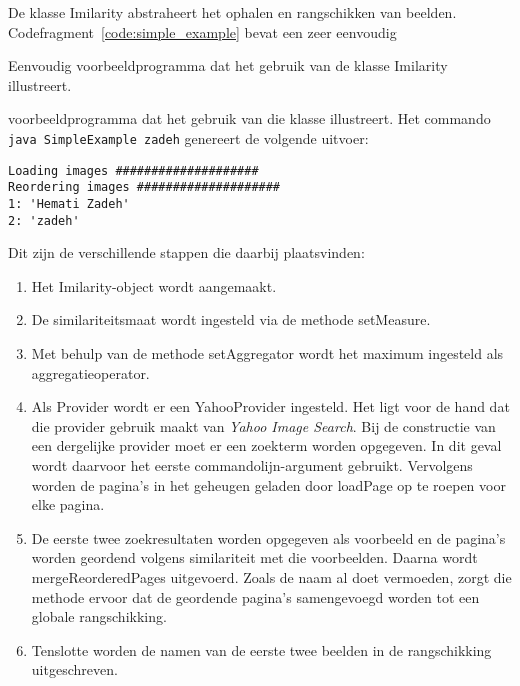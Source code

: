 De klasse {\klassefont Imilarity} abstraheert het ophalen en rangschikken van
beelden. Codefragment~\ref{code:simple_example} bevat een zeer eenvoudig 
\begin{code}[bp]
\vspace{5pt}
\begin{lgrind}

\end{lgrind}
\vspace{5pt}
\caption{\label{code:simple_example}Eenvoudig voorbeeldprogramma dat het gebruik van
de klasse {\klassefont Imilarity} illustreert.}
\end{code}
voorbeeldprogramma dat het gebruik van die klasse illustreert. Het commando
\texttt{java SimpleExample zadeh} genereert de volgende uitvoer:
\begin{verbatim}
Loading images ####################
Reordering images ####################
1: 'Hemati Zadeh'
2: 'zadeh'
\end{verbatim} 
Dit zijn de verschillende stappen die daarbij plaatsvinden:
\begin{enumerate}
  \item Het {\klassefont Imilarity}-object wordt aangemaakt.
  \item De similariteitsmaat wordt ingesteld via de methode {\klassefont setMeasure}.
  \item Met behulp van de methode {\klassefont setAggregator} wordt het maximum ingesteld als
		aggregatieoperator. 
  \item Als {\klassefont Provider} wordt er een {\klassefont YahooProvider} ingesteld.
  	    Het ligt voor de hand dat die provider gebruik maakt van
  	    \emph{Yahoo Image Search}. Bij de constructie van een dergelijke provider
  	    moet er een zoekterm worden opgegeven. In dit geval wordt daarvoor het eerste 
  	    commandolijn-argument gebruikt. Vervolgens worden de pagina's in 
  	    het geheugen geladen door {\klassefont loadPage} op te roepen voor elke pagina.
  \item De eerste twee zoekresultaten worden opgegeven als voorbeeld en de pagina's
        worden geordend volgens similariteit met die voorbeelden. Daarna wordt
        {\klassefont mergeReorderedPages} uitgevoerd. Zoals de naam al doet vermoeden,
        zorgt die methode ervoor dat de geordende pagina's samengevoegd 
        worden tot een globale rangschikking.
  \item Tenslotte worden de namen van de eerste twee beelden in de rangschikking 
  	    uitgeschreven.
\end{enumerate}


